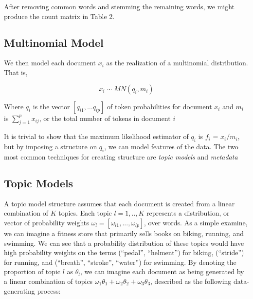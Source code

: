 \documentclass[12pt]{article}
\begin{document}
After removing common words and stemming the remaining words, we might
produce the count matrix in Table 2. 


\begin{table}[!hbpt]
\caption{Creating a word-count matrix from text}
\begin{center}
\end{center}
\end{table} 



\subsection{Multinomial Model}\label{multinomial-model}

We then model each document $x_i$ as the realization of a multinomial
distribution. That is,

\[ x_{i} \sim MN(q_i,m_i) \]

Where $q_i$ is the vector $[q_{i1}, \dots q_{ip}]$ of token
probabilities for document $x_i$ and $m_i$ is
$\sum_{j = 1}^{p}{x_{ij}}$, or the total number of tokens in document
$i$

It is trivial to show that the maximum likelihood estimator of $q_i$ is
$f_i$ = $x_i / m_i$, but by imposing a structure on $q_i$, we can model
features of the data. The two most common techniques for creating
structure are \emph{topic models} and \emph{metadata}

\subsection{Topic Models}\label{topic-models}

A topic model structure assumes that each document is created from a
linear combination of $K$ topics. Each topic $l = 1,..,K$ represents a
distribution, or vector of probability weights
$\omega_l = [\omega_{l1}, ... , \omega_{lp}]$, over words. As a simple
examine, we can imagine a fitness store that primarily sells books on
biking, running, and swimming. We can see that a probability
distribution of these topics would have high probability weights on the
terms (``pedal'', ``helment'') for biking, (``stride'') for running, and
(``breath'', ``stroke'', ``water'') for swimming. By denoting the
proportion of topic $l$ as $\theta_l$, we can imagine each document as
being generated by a linear combination of topics
$\omega_1 \theta_1 + \omega_2 \theta_2 + \omega_3 \theta_3$, described
as the following data-generating process:
\end{document}
